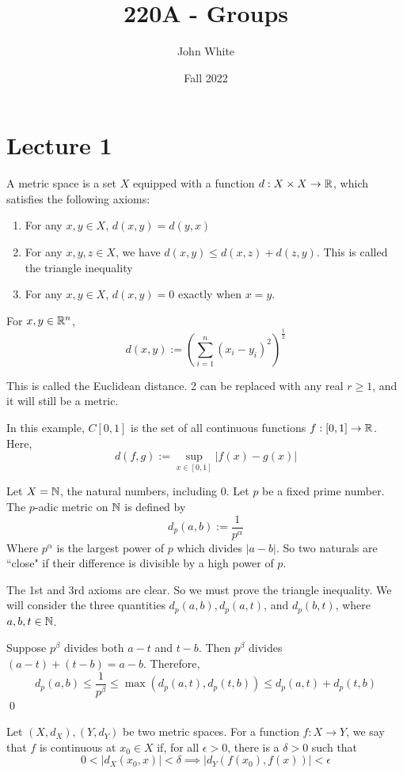 \documentclass[x11names,reqno,14pt]{extarticle}
\title{220A - Groups}
\author{John White}
\date{Fall 2022}
\begin{document}
\section{Lecture 1}


A metric space is a set $X$ equipped with a function $d:X\times X \to \mathbb{R}$, which satisfies the following axioms:
\begin{enumerate}
	\item For any $x, y \in X$, $d(x, y) = d(y, x)$
	\item For any $x, y, z \in X$, we have $d(x, y) \leq d(x, z) + d(z, y)$. This is called the triangle inequality
	\item For any $x, y \in X$, $d(x, y) = 0$ exactly when $x = y$.

\end{enumerate}

\exm

For $x, y \in \mathbb{R}^n$, 
\[
d(x, y) := \left(\sum_{i=1}^n(x_i - y_i)^2\right)^{\frac{1}{2}}
\]

This is called the Euclidean distance. 2 can be replaced with any real $r \geq 1$, and it will still be a metric. 

\exm 

In this example, $C[0, 1]$ is the set of all continuous functions $f:[0, 1]\to\mathbb{R}$. Here, 
\[
d(f, g) := \sup_{x\in[0,1]}|f(x)- g(x)|
\]

\exm

Let $X = \mathbb{N}$, the natural numbers, including $0$. Let $p$ be a fixed prime number. The $p$-adic metric on $\mathbb{N}$ is defined by 
\[
d_p(a, b) := \frac{1}{p^\alpha} 
\]
Where $p^\alpha$ is the largest power of $p$ which divides $|a - b|$. So two naturals are ``close" if their difference is divisible by a high power of $p$. 

\proof
The 1st and 3rd axioms are clear. So we must prove the triangle inequality. We will consider the three quantities $d_p(a, b), d_p(a, t)$, and $d_p(b, t)$, where $a, b, t \in \mathbb{N}$. 

Suppose $p^\beta$ divides both $a - t$ and $t - b$. Then $p^\beta$ divides $(a - t) + (t - b) = a - b$. Therefore, 
\[
d_p(a, b) \leq \frac{1}{p^\beta} \leq \max(d_p(a, t), d_p(t, b)) \leq d_p(a, t) + d_p(t, b)
\]
\qed


Let $(X, d_X), (Y, d_Y)$ be two metric spaces. For a function $f:X\to Y$, we say that $f$ is continuous at $x_0 \in X$ if, for all $\epsilon > 0$, there is a $\delta > 0$ such that 
\[
0 < |d_X(x_0, x)| < \delta \implies |d_Y(f(x_0), f(x))| < \epsilon
\]
\end{document}
